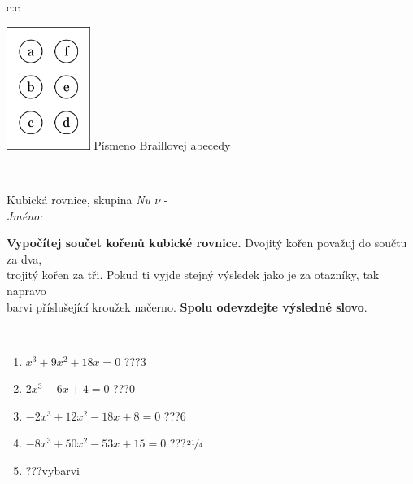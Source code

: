 \documentclass[10pt]{report}
\begin{document}
\begin{tabular}{c:c}
\begin{minipage}[c][104.5mm][t]{0.5\linewidth}
\begin{center}
\begin{minipage}{0.20\linewidth}
\begin{center}
\includegraphics[height=40mm]{../images/braille.png}
{\small Písmeno Braillovej abecedy}
\end{center}
\end{minipage}
\end{center}
\end{minipage}
\\ \hdashline
\begin{minipage}[c][104.5mm][t]{0.5\linewidth}
\begin{center}
\vspace{7mm}
{\huge Kubická rovnice, skupina \textit{Nu $\nu$} -}\\[5mm]
\textit{Jméno:}\phantom{xxxxxxxxxxxxxxxxxxxxxxxxxxxxxxxxxxxxxxxxxxxxxxxxxxxxxxxxxxxxxxxxx}\\[5mm]
\begin{minipage}{0.95\linewidth}
\begin{center}
\textbf{Vypočítej součet kořenů kubické rovnice.} Dvojitý kořen považuj do součtu za dva,\\trojitý kořen za tři. Pokud ti vyjde stejný výsledek jako je za otazníky, tak napravo\\barvi příslušející kroužek načerno. \textbf{Spolu odevzdejte výsledné slovo}.
\end{center}
\end{minipage}
\\[1mm]
\begin{minipage}{0.79\linewidth}
\begin{center}
\begin{varwidth}{\linewidth}
\begin{enumerate}
\Large
\item $x^3+9x^2+18x=0$\quad \dotfill\; ???\;\dotfill \quad $3$
\item $2x^3-6x+4=0$\quad \dotfill\; ???\;\dotfill \quad $0$
\item $-2x^3+12x^2-18x+8=0$\quad \dotfill\; ???\;\dotfill \quad $6$
\item $-8x^3+50x^2-53x+15=0$\quad \dotfill\; ???\;\dotfill \quad $\nicefrac{21}{4}$
\item \quad \dotfill\; ???\;\dotfill \quad vybarvi

\end{enumerate}
\end{varwidth}
\end{center}
\end{minipage}
\end{center}
\end{minipage}
\end{tabular}
\end{document}
